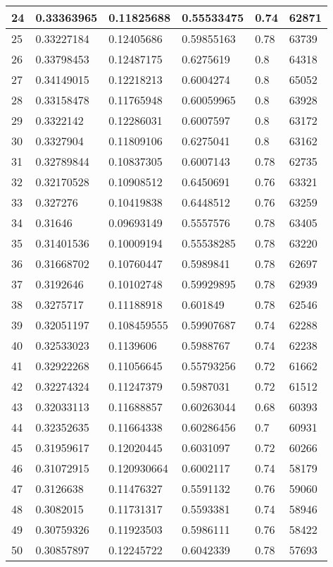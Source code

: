\begin{longtable}{|l|l|l|l|l|l|}
24 & 0.33363965 & 0.11825688 & 0.55533475 & 0.74 & 62871 \\ \hline 
25 & 0.33227184 & 0.12405686 & 0.59855163 & 0.78 & 63739 \\ \hline 
26 & 0.33798453 & 0.12487175 & 0.6275619 & 0.8 & 64318 \\ \hline 
27 & 0.34149015 & 0.12218213 & 0.6004274 & 0.8 & 65052 \\ \hline 
28 & 0.33158478 & 0.11765948 & 0.60059965 & 0.8 & 63928 \\ \hline 
29 & 0.3322142 & 0.12286031 & 0.6007597 & 0.8 & 63172 \\ \hline 
30 & 0.3327904 & 0.11809106 & 0.6275041 & 0.8 & 63162 \\ \hline 
31 & 0.32789844 & 0.10837305 & 0.6007143 & 0.78 & 62735 \\ \hline 
32 & 0.32170528 & 0.10908512 & 0.6450691 & 0.76 & 63321 \\ \hline 
33 & 0.327276 & 0.10419838 & 0.6448512 & 0.76 & 63259 \\ \hline 
34 & 0.31646 & 0.09693149 & 0.5557576 & 0.78 & 63405 \\ \hline 
35 & 0.31401536 & 0.10009194 & 0.55538285 & 0.78 & 63220 \\ \hline 
36 & 0.31668702 & 0.10760447 & 0.5989841 & 0.78 & 62697 \\ \hline 
37 & 0.3192646 & 0.10102748 & 0.59929895 & 0.78 & 62939 \\ \hline 
38 & 0.3275717 & 0.11188918 & 0.601849 & 0.78 & 62546 \\ \hline 
39 & 0.32051197 & 0.108459555 & 0.59907687 & 0.74 & 62288 \\ \hline 
40 & 0.32533023 & 0.1139606 & 0.5988767 & 0.74 & 62238 \\ \hline 
41 & 0.32922268 & 0.11056645 & 0.55793256 & 0.72 & 61662 \\ \hline 
42 & 0.32274324 & 0.11247379 & 0.5987031 & 0.72 & 61512 \\ \hline 
43 & 0.32033113 & 0.11688857 & 0.60263044 & 0.68 & 60393 \\ \hline 
44 & 0.32352635 & 0.11664338 & 0.60286456 & 0.7 & 60931 \\ \hline 
45 & 0.31959617 & 0.12020445 & 0.6031097 & 0.72 & 60266 \\ \hline 
46 & 0.31072915 & 0.120930664 & 0.6002117 & 0.74 & 58179 \\ \hline 
47 & 0.3126638 & 0.11476327 & 0.5591132 & 0.76 & 59060 \\ \hline 
48 & 0.3082015 & 0.11731317 & 0.5593381 & 0.74 & 58946 \\ \hline 
49 & 0.30759326 & 0.11923503 & 0.5986111 & 0.76 & 58422 \\ \hline 
50 & 0.30857897 & 0.12245722 & 0.6042339 & 0.78 & 57693 \\ \hline 
\end{longtable}